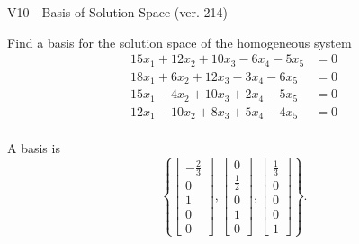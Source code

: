 \begin{exercise}
  \begin{exerciseTitle}V10 - Basis of Solution Space (ver. 214)\end{exerciseTitle}
  \begin{exerciseStatement}
    Find a basis for the solution space of the homogeneous system 
\begin{align*}
 15 x_ 1 + 12 x_ 2 + 10 x_ 3 -6 x_ 4 -5 x_ 5 &= 0  \\ 
  18 x_ 1 + 6 x_ 2 + 12 x_ 3 -3 x_ 4 -6 x_ 5 &= 0  \\ 
  15 x_ 1 -4 x_ 2 + 10 x_ 3 + 2 x_ 4 -5 x_ 5 &= 0  \\ 
  12 x_ 1 -10 x_ 2 + 8 x_ 3 + 5 x_ 4 -4 x_ 5 &= 0  \\ 
 \end{align*}


 
  \end{exerciseStatement}

  \begin{exerciseAnswer}
   A basis is   
\[\left\{\left[\begin{array}{c}
-\frac{2}{3} \\
0 \\
1 \\
0 \\
0
\end{array}\right] , \left[\begin{array}{c}
0 \\
\frac{1}{2} \\
0 \\
1 \\
0
\end{array}\right] , \left[\begin{array}{c}
\frac{1}{3} \\
0 \\
0 \\
0 \\
1
\end{array}\right]\right\}.\]

  


  \end{exerciseAnswer}
\end{exercise}